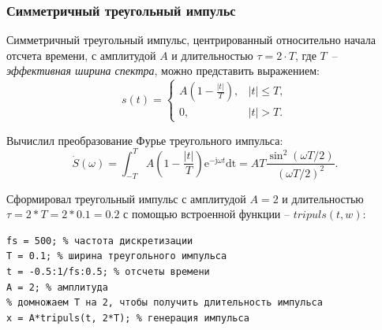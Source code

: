 \documentclass[12pt,a4paper]{article}
\begin{document}
\subsubsection{Симметричный треугольный импульс}

Симметричный треугольный импульс, центрированный относительно начала отсчета времени, с амплитудой $A$ и длительностью $\tau=2\cdot T$, где $T$~-- \emph{эффективная ширина спектра}, можно представить выражением:
\begin{equation}
\nonumber
s\left(t\right)=
  \begin{cases}
    A\left(1-\frac{|t|}{T}\right), &|t| \leq T, \\
    0, &|t| > T.
  \end{cases}
\end{equation}

Вычислил преобразование Фурье треугольного импульса:
\begin{equation}
\nonumber
\dot{S}\left(\omega\right)=\int_{-T}^T{A\left(1-\frac{|t|}{T}\right)\mathrm{e}^{-\mathrm{j}\omega t}\mathrm{dt}}=AT\frac{\sin^2\left(\omega T/2\right)}{\left(\omega T/2\right)^2}.
\end{equation}

Сформировал треугольный импульс с амплитудой $A=2$ и длительностью $\tau=2*T=2*0.1=0.2$ с помощью встроенной функции -- $tripuls(t,w)$:
\begin{verbatim}
fs = 500; % частота дискретизации
T = 0.1; % ширина треугольного импульса
t = -0.5:1/fs:0.5; % отсчеты времени
A = 2; % амплитуда
% домножаем T на 2, чтобы получить длительность импульса
x = A*tripuls(t, 2*T); % генерация импульса
\end{verbatim}
\end{document}
